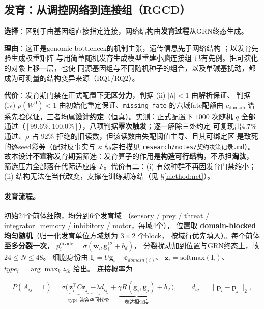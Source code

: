 \subsection{发育：从调控网络到连接组（RGCD）}\label{method:dev}

\textbf{选择}：区别于由基因组直接指定连接，网络结构由\textbf{发育过程}从GRN终态生成。

\textbf{理由}：这正是genomic bottleneck的机制主张，遗传信息先于网络结构
\citep{bib1_zador2019,bib3_shuvaev2024}；以发育先验生成权重矩阵
\citep{bib2_barabasi2023} 与用简单随机发育生成模型重建小脑连接组
\citep{bib4_richter2025} 已有先例。把可演化的对象上移一层，也使
同源基因组与不同随机种子的组合，以及单碱基扰动，都成为可测量的结构变异来源（RQ1/RQ2）。

\textbf{代价}：发育期门禁在正式配置下\textbf{无区分力}，判据 (ii) $|h|<1$ 由解析保证、
判据 (iv) $\rho(W^0)<1$ 由初始化重定保证、\texttt{missing\_fate} 的六域fate配额由
$c_{\mathrm{domain}}$ 谱系先验保证，三者均属\textbf{设计约定}（恒真）。实测：正式配置下
$1000$ 次随机 $q$ 全部通过（$[99.6\%,100.0\%]$），八项判据\textbf{零次触发}；逐一解除三处约定
可复现出$4.7\%$ 通过、$\rho$ 占 $92\%$ 拒绝的旧读数，但该读数由失配阈值主导、且其可绑定区
是致死的逐seed彩券（配对反事实与 $\kappa$ 标定扫描见 \texttt{research/notes/契约决策记录.md}）。
故本设计\textbf{不宣称}发育期强筛选：发育算子的作用是\textbf{构造可行结构}，不承担\textbf{淘汰}，
筛选压力全部落在代际适应度 $F$。代价有二：(i) 有效种群不再因发育门禁缩小；
(ii) 结构无法在当代改变，支撑在训练期冻结（见 \S\ref{method:net}）。

\paragraph{发育流程。}初始24个前体细胞，均分到6个发育域
（sensory / prey / threat / integrator\_memory / inhibitory / motor，每域4个），
位置取 \textbf{domain-blocked均匀随机}（归一化发育单位方域划为 $3\times2$ 个block，
按域行优先填入）。每个前体\textbf{至多分裂一次}，
$p_i^{\mathrm{divide}}=\sigma(\mathbf w_d^\top\mathbf g_i^{12}+b_d)$，
分裂扰动加到位置与GRN终态上，故 $24\le N\le 48$。
细胞身份由 $\mathbf l_i=U\mathbf g_i+\mathbf c_{domain(i)}$、
$\mathbf z_i=\mathrm{softmax}(\mathbf l_i)$、$type_i=\arg\max_k z_{ik}$ 给出。
连接概率为

\begin{equation}\label{method:eq-lij}
P(A_{ij}=1)=\sigma\bigl(\underbrace{\mathbf z_i^\top C\mathbf z_j}_{\text{type 兼容}}
\underbrace{-\lambda d_{ij}}_{\text{空间代价}}
+\underbrace{\gamma R(\mathbf g_i,\mathbf g_j)}_{\text{表达相似度}}
+b_A\bigr),\qquad d_{ij}=\lVert \mathbf p_i-\mathbf p_j\rVert_2,
\end{equation}


